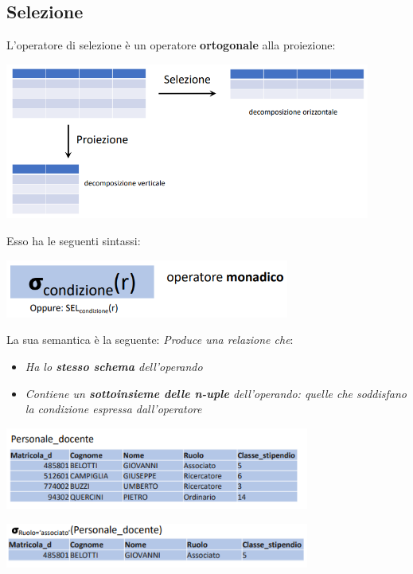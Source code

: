 \documentclass[12pt]{article}
\begin{document}
\subsection{Selezione}
L'operatore di selezione è un operatore \textbf{ortogonale} alla proiezione:
\begin{center}
    \includegraphics[width =0.90\textwidth]{Images/133.PNG}
\end{center}
Esso ha le seguenti sintassi:
\begin{center}
    \includegraphics[width =0.70\textwidth]{Images/134.PNG}
\end{center}
La sua semantica è la seguente: \textit{Produce una relazione che}:
\begin{itemize}
    \item \textit{Ha lo \textbf{stesso schema} dell'operando}
    \item \textit{Contiene  un \textbf{sottoinsieme delle n-uple} dell'operando: quelle che soddisfano la condizione espressa dall'operatore}
\end{itemize}
\begin{center}
    \includegraphics[width =0.75\textwidth]{Images/135.PNG}
\end{center}
\begin{center}
    \includegraphics[width =0.75\textwidth]{Images/136.PNG}
\end{center}
\end{document}
